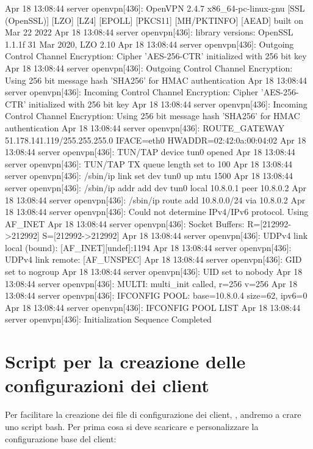 \begin{bashcode}
Apr 18 13:08:44 server openvpn[436]: OpenVPN 2.4.7 x86_64-pc-linux-gnu [SSL (OpenSSL)] [LZO] [LZ4] [EPOLL] [PKCS11] [MH/PKTINFO] [AEAD] built on Mar 22 2022
Apr 18 13:08:44 server openvpn[436]: library versions: OpenSSL 1.1.1f  31 Mar 2020, LZO 2.10
Apr 18 13:08:44 server openvpn[436]: Outgoing Control Channel Encryption: Cipher 'AES-256-CTR' initialized with 256 bit key
Apr 18 13:08:44 server openvpn[436]: Outgoing Control Channel Encryption: Using 256 bit message hash 'SHA256' for HMAC authentication
Apr 18 13:08:44 server openvpn[436]: Incoming Control Channel Encryption: Cipher 'AES-256-CTR' initialized with 256 bit key
Apr 18 13:08:44 server openvpn[436]: Incoming Control Channel Encryption: Using 256 bit message hash 'SHA256' for HMAC authentication
Apr 18 13:08:44 server openvpn[436]: ROUTE_GATEWAY 51.178.141.119/255.255.255.0 IFACE=eth0 HWADDR=02:42:0a:00:04:02
Apr 18 13:08:44 server openvpn[436]: TUN/TAP device tun0 opened
Apr 18 13:08:44 server openvpn[436]: TUN/TAP TX queue length set to 100
Apr 18 13:08:44 server openvpn[436]: /sbin/ip link set dev tun0 up mtu 1500
Apr 18 13:08:44 server openvpn[436]: /sbin/ip addr add dev tun0 local 10.8.0.1 peer 10.8.0.2
Apr 18 13:08:44 server openvpn[436]: /sbin/ip route add 10.8.0.0/24 via 10.8.0.2
Apr 18 13:08:44 server openvpn[436]: Could not determine IPv4/IPv6 protocol. Using AF_INET
Apr 18 13:08:44 server openvpn[436]: Socket Buffers: R=[212992->212992] S=[212992->212992]
Apr 18 13:08:44 server openvpn[436]: UDPv4 link local (bound): [AF_INET][undef]:1194
Apr 18 13:08:44 server openvpn[436]: UDPv4 link remote: [AF_UNSPEC]
Apr 18 13:08:44 server openvpn[436]: GID set to nogroup
Apr 18 13:08:44 server openvpn[436]: UID set to nobody
Apr 18 13:08:44 server openvpn[436]: MULTI: multi_init called, r=256 v=256
Apr 18 13:08:44 server openvpn[436]: IFCONFIG POOL: base=10.8.0.4 size=62, ipv6=0
Apr 18 13:08:44 server openvpn[436]: IFCONFIG POOL LIST
Apr 18 13:08:44 server openvpn[436]: Initialization Sequence Completed
\end{bashcode}


\section{Script per la creazione delle configurazioni dei client}

Per facilitare la creazione dei file di configurazione dei client, , andremo a crare uno script bash. Per prima cosa si deve scaricare e personalizzare la configurazione base del client:

